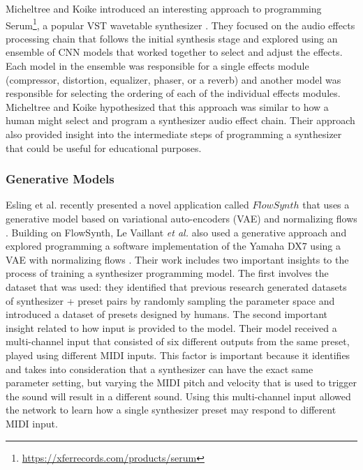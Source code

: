 Micheltree and Koike introduced an interesting approach to programming Serum\footnote{\url{https://xferrecords.com/products/serum}}, a popular VST wavetable synthesizer \cite{mitcheltree2021serumrnn}. They focused on the audio effects processing chain that follows the initial synthesis stage and explored using an ensemble of CNN models that worked together to select and adjust the effects. Each model in the ensemble was responsible for a single effects module (compressor, distortion, equalizer, phaser, or a reverb) and another model was responsible for selecting the ordering of each of the individual effects modules. Micheltree and Koike hypothesized that this approach was similar to how a human might select and program a synthesizer audio effect chain. Their approach also provided insight into the intermediate steps of programming a synthesizer that could be useful for educational purposes.

\subsubsection{Generative Models}
Esling et al. recently presented a novel application called $FlowSynth$ that uses a generative model based on variational auto-encoders (VAE) and normalizing flows \cite{esling2020flow}. Building on FlowSynth, Le Vaillant \textit{et al.} also used a generative approach and explored programming a software implementation of the Yamaha DX7 using a VAE with normalizing flows \cite{le2021improving}. Their work includes two important insights to the process of training a synthesizer programming model. The first involves the dataset that was used: they identified that previous research generated datasets of synthesizer + preset pairs by randomly sampling the parameter space and introduced a dataset of presets designed by humans. The second important insight related to how input is provided to the model. Their model received a multi-channel input that consisted of six different outputs from the same preset, played using different MIDI inputs. This factor is important because it identifies and takes into consideration that a synthesizer can have the exact same parameter setting, but varying the MIDI pitch and velocity that is used to trigger the sound will result in a different sound. Using this multi-channel input allowed the network to learn how a single synthesizer preset may respond to different MIDI input.

